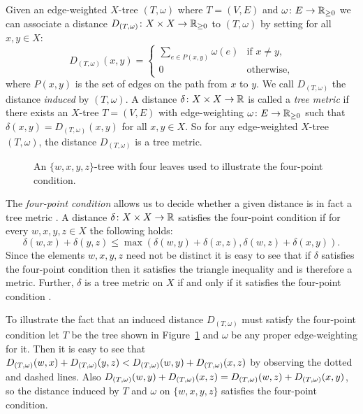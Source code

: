 Given an edge-weighted $X$-tree $(T,\omega)$ where $T=(V,E)$ and $\omega
\colon E \to {\mathbb R}_{\geq 0}$ we can associate a distance $D_{(T,\omega)} \colon X
\times X \to {\mathbb R}_{\geq 0}$ to $(T,\omega)$ by setting for all $x,y \in X$:
\begin{equation*}
  D_{(T,\omega)}(x,y) =
  \begin{cases}
    \displaystyle
    \sum_{e \in P(x,y)} \omega(e) & \text{if $x \neq y$},\\
    0 & \text{otherwise,}
  \end{cases}
\end{equation*}
where $P(x,y)$ is the set of edges on the path from $x$ to $y$.  We call
$D_{(T,\omega)}$ the distance \textit{induced} by $(T,\omega)$.  A distance
$\delta \colon X \times X \to {\mathbb R}$ is called a \textit{tree metric} if there
exists an $X$-tree $T=(V,E)$ with edge-weighting $\omega \colon E \to {\mathbb R}_{\geq 0}$
such that $\delta(x,y) = D_{(T,\omega)}(x,y)$ for all $x,y \in X$.  So for any
edge-weighted $X$-tree $(T,\omega)$, the distance $D_{(T,\omega)}$ is a tree
metric.

\begin{figure}
  \centering
  
  \caption{An $\{w,x,y,z\}$-tree with four leaves used to illustrate the
    four-point condition.}
  \label{fig:quartet-tree}
\end{figure}

The \textit{four-point condition} allows us to decide whether a given distance
is in fact a tree metric \cite{semple2003phylogenetics}.  A distance $\delta
\colon X \times X \to {\mathbb R}$ satisfies the four-point condition if for every
$w,x,y,z \in X$ the following holds:
\begin{equation*}
  \delta(w,x) + \delta(y,z) \leq \max(\delta(w,y)+\delta(x,z),
                                      \delta(w,z)+\delta(x,y)).
\end{equation*}
Since the elements $w,x,y,z$ need not be distinct it is easy to see that if
$\delta$ satisfies the four-point condition then it satisfies the triangle
inequality and is therefore a metric.  Further, $\delta$ is a tree metric on
$X$ if and only if it satisfies the four-point condition
\citep[Theorem 7.2.6]{semple2003phylogenetics}.

To illustrate the fact that an induced distance $D_{(T,\omega)}$ must satisfy
the four-point condition let $T$ be the tree shown in
Figure~\ref{fig:quartet-tree} and $\omega$ be any proper edge-weighting for
it.  Then it is easy to see that $D_{(T,\omega)}(w,x)+D_{(T,\omega)}(y,z) < D_{(T,\omega)}(w,y)+D_{(T,\omega)}(x,z)$
by observing the dotted and dashed lines.  Also $D_{(T,\omega)}(w,y)+D_{(T,\omega)}(x,z) =
D_{(T,\omega)}(w,z)+D_{(T,\omega)}(x,y)$, so the distance induced by $T$ and $\omega$ on
$\{w,x,y,z\}$ satisfies the four-point condition.

